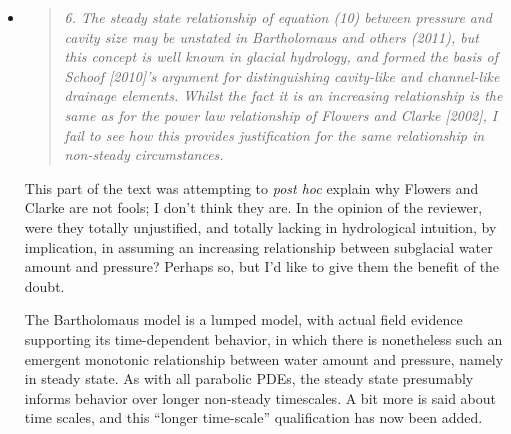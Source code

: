 \documentclass[11pt,reqno]{amsart}
\newcommand{\reply}[2]{
\medskip\medskip
\item  \begin{quote}
\emph{#1}
\end{quote}

\medskip
\noindent #2}
\begin{document}
\begin{itemize}
{The text of the manuscript never suggests such usage of equation (10).  The revised text makes this even more clear.}

\reply{6. The steady state relationship of equation (10) between pressure and cavity size may be unstated in Bartholomaus and others (2011), but this concept is well known in glacial hydrology, and formed the basis of Schoof [2010]’s argument for distinguishing cavity-like and channel-like drainage elements. Whilst the fact it is an increasing relationship is the same as for the power law relationship of Flowers and Clarke [2002], I fail to see how this provides justification for the same relationship in non-steady circumstances.}
{This part of the text was attempting to \emph{post hoc} explain why Flowers and Clarke are not fools; I don't think they are.  In the opinion of the reviewer, were they totally unjustified, and totally lacking in hydrological intuition, by implication, in assuming an increasing relationship between subglacial water amount and pressure?  Perhaps so, but I'd like to give them the benefit of the doubt.

The Bartholomaus model is a lumped model, with actual field evidence supporting its time-dependent behavior, in which there is nonetheless such an emergent monotonic relationship between water amount and pressure, namely in steady state.  As with all parabolic PDEs, the steady state presumably informs behavior over longer non-steady timescales.  A bit more is said about time scales, and this ``longer time-scale'' qualification has now been added.}
\end{itemize}
\end{document}
